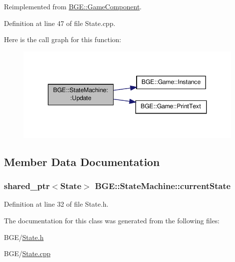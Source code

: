 Reimplemented from \hyperlink{class_b_g_e_1_1_game_component_ac8e444827ee0be9ad654cdff4d15f071}{B\-G\-E\-::\-Game\-Component}.



Definition at line 47 of file State.\-cpp.



Here is the call graph for this function\-:
\nopagebreak
\begin{figure}[H]
\begin{center}
\leavevmode
\includegraphics[width=340pt]{class_b_g_e_1_1_state_machine_a0bbd130dee59706b7d1a9422d922fcfc_cgraph}
\end{center}
\end{figure}




\subsection{Member Data Documentation}
\hypertarget{class_b_g_e_1_1_state_machine_a5698ea2fa8f5a52cc8cdde09ba09c628}{
\subsubsection[{current\-State}]{\setlength{\rightskip}{0pt plus 5cm}shared\-\_\-ptr$<${\bf State}$>$ B\-G\-E\-::\-State\-Machine\-::current\-State}}\label{class_b_g_e_1_1_state_machine_a5698ea2fa8f5a52cc8cdde09ba09c628}


Definition at line 32 of file State.\-h.



The documentation for this class was generated from the following files\-:\begin{DoxyCompactItemize}
\item 
B\-G\-E/\hyperlink{_state_8h}{State.\-h}\item 
B\-G\-E/\hyperlink{_state_8cpp}{State.\-cpp}\end{DoxyCompactItemize}
